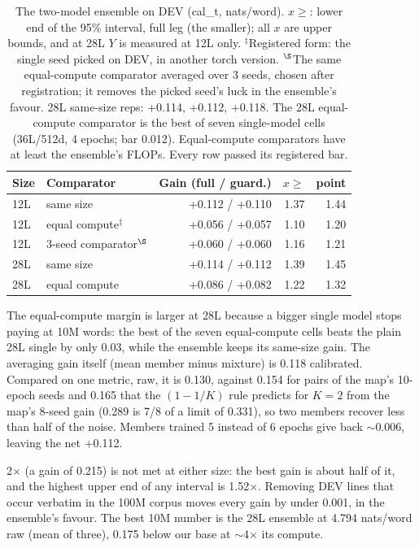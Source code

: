 \documentclass[11pt]{article}
\begin{document}
\begin{table}[t]
\centering
\small
\setlength{\tabcolsep}{3.5pt}
\begin{tabular}{@{}llrrr@{}}
\toprule
Size & Comparator & Gain (full / guard.) & $x\geq$ & point \\
\midrule
12L & same size & +0.112 / +0.110 & 1.37 & 1.44 \\
12L & equal compute$^\ddagger$ & +0.056 / +0.057 & 1.10 & 1.20 \\
12L & 3-seed comparator$^\S$ & +0.060 / +0.060 & 1.16 & 1.21 \\
28L & same size & +0.114 / +0.112 & 1.39 & 1.45 \\
28L & equal compute & +0.086 / +0.082 & 1.22 & 1.32 \\
\bottomrule
\end{tabular}
\caption{The two-model ensemble on DEV (cal\_t, nats/word). $x\geq$: lower end of the 95\% interval, full leg
(the smaller); all $x$ are upper bounds, and at 28L $Y$ is measured at 12L only. $^\ddagger$Registered form: the
single seed picked on DEV, in another torch version. $^\S$The same equal-compute comparator averaged over 3 seeds, chosen
after registration; it removes the picked seed's luck in the ensemble's favour. 28L same-size reps:
+0.114, +0.112, +0.118. The 28L equal-compute comparator is the best of seven single-model cells (36L/512d, 4 epochs; bar
0.012). Equal-compute comparators have at least the ensemble's FLOPs. Every row passed its registered bar.}
\label{tab:ensemble}
\end{table}

The equal-compute margin is larger at 28L because a bigger single model stops paying at 10M words: the best of the
seven equal-compute cells beats the plain 28L single by only 0.03, while the ensemble keeps its same-size gain. The
averaging gain itself (mean member minus mixture) is 0.118 calibrated. Compared on one metric, raw, it is 0.130,
against 0.154 for pairs of the map's 10-epoch seeds and 0.165 that the $(1 - 1/K)$ rule predicts for $K=2$ from the
map's 8-seed gain (0.289 is 7/8 of a limit of 0.331), so two members recover less than half of the noise. Members
trained 5 instead of 6 epochs give back $\sim$0.006, leaving the net +0.112.

2$\times$ (a gain of 0.215) is not met at either size: the best gain is about half of it, and the highest upper end
of any interval is 1.52$\times$. Removing DEV lines that occur verbatim in the 100M corpus moves every gain by under
0.001, in the ensemble's favour. The best 10M number is the 28L ensemble at 4.794 nats/word raw (mean of three), 0.175
below our base at $\sim$4$\times$ its compute.
\end{document}
